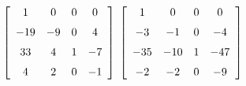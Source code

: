 {$ \left[ \begin {array}{cccc} 1&0&0&0\\\noalign{\medskip}-19&-9&0&4
\\\noalign{\medskip}33&4&1&-7\\\noalign{\medskip}4&2&0&-1\end {array}
 \right] $ 
}
{$ \left[ \begin {array}{cccc} 1&0&0&0\\\noalign{\medskip}-3&-1&0&-4
\\\noalign{\medskip}-35&-10&1&-47\\\noalign{\medskip}-2&-2&0&-9
\end {array} \right] $}

